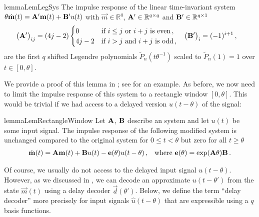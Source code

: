 \begin{restatable}{lemma}{LemLegSys}
The impulse response of the linear time-invariant system $\theta \dot{\mathbf{m}}(t) = {\mathbf{A}}' \mathbf{m}(t) + {\mathbf{B}}' u(t)$ with $\vec m \in \mathbb{R}^q$, ${\mathbf{A}}' \in \mathbb{R}^{q \times q}$ and ${\mathbf{B}}' \in \mathbb{R}^{q \times 1}$
\begin{align*}
	\begin{aligned}
	\big({\mathbf{A}'}\big)_{ij} &= (4j - 2) \begin{cases}
			0 & \text{if } i \leq j \text{ or } i + j \text{ is even} \,, \\
			4j - 2 & \text{if } i > j \text{ and } i + j \text{ is odd} \,,
		\end{cases} &
	\big({\mathbf{B}'}\big)_i &= (-1)^{i + 1} \,,
	\end{aligned}
\end{align*}
are the first $q$ shifted Legendre polynomials $\tilde P_n(t \theta^{-1})$ scaled to $\tilde P_n(1) = 1$ over $t \in [0, \theta]$.
\label{lem:leg_sys}
\end{restatable}
\noindent We provide a proof of this lemma in ; see  for an example.
As before, we now need to limit the impulse response of this system to a rectangle window $[0, \theta]$.
This would be trivial if we had access to a delayed version $u(t - \theta)$ of the signal:
\begin{restatable}{lemma}{LemRectangleWindow}
\label{lem:rectangle_window}
Let $\mathbf{A}$, $\mathbf{B}$ describe an \LTI system and let $u(t)$ be some input signal.
The impulse response of the following modified system is unchanged compared to the original \LTI system for $0 \leq t < \theta$ but zero for all $t \geq \theta$%
\begin{align*}
	\dot{\mathbf{m}}(t) &= \mathbf{A} \mathbf{m}(t) + \mathbf{B} u(t) - \mathbf{e}(\theta) u(t - \theta) \,, & \text{where } \mathbf{e}(\theta) = \exp(\mathbf{A} \theta) \mathbf{B} \,.
\end{align*}
\end{restatable}

Of course, we usually do not access to the delayed input signal $u(t - \theta)$.
However, as we discussed in , we can decode an approximate $u(t - \theta')$ from the state $\vec m(t)$ using a delay decoder $\vec d(\theta')$.
Below, we define the term \enquote{delay decoder} more precisely for input signals $\hat u(t - \theta)$ that are expressible using a $q$ basis functions.

